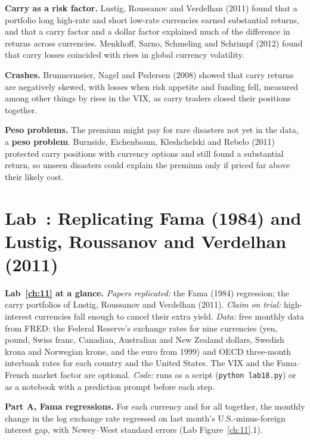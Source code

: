 \textbf{Carry as a risk factor.} Lustig, Roussanov and Verdelhan (2011) found that a portfolio long high-rate and short low-rate currencies earned substantial returns, and that a carry factor and a dollar factor explained much of the difference in returns across currencies. Menkhoff, Sarno, Schmeling and Schrimpf (2012) found that carry losses coincided with rises in global currency volatility.

\textbf{Crashes.} Brunnermeier, Nagel and Pedersen (2008) showed that carry returns are negatively skewed, with losses when risk appetite and funding fell, measured among other things by rises in the VIX, as carry traders closed their positions together.

\textbf{Peso problems.} The premium might pay for rare disasters not yet in the data, a \textbf{peso problem}. Burnside, Eichenbaum, Kleshchelski and Rebelo (2011) protected carry positions with currency options and still found a substantial return, so unseen disasters could explain the premium only if priced far above their likely cost.

\section{Lab~\thechapter: Replicating Fama (1984) and Lustig, Roussanov and Verdelhan (2011)}
\label{sec:06-lab}

\begin{callout}
\textbf{Lab~\ref{ch:11} at a glance.} \emph{Papers replicated:} the Fama (1984) regression; the carry portfolios of Lustig, Roussanov and Verdelhan (2011). \emph{Claim on trial:} high-interest currencies fall enough to cancel their extra yield. \emph{Data:} free monthly data from FRED: the Federal Reserve's exchange rates for nine currencies (yen, pound, Swiss franc, Canadian, Australian and New Zealand dollars, Swedish krona and Norwegian krone, and the euro from 1999) and OECD three-month interbank rates for each country and the United States. The VIX and the Fama--French market factor are optional. \emph{Code:} runs as a script (\texttt{python lab18.py}) or as a notebook with a prediction prompt before each step.
\end{callout}

\textbf{Part A, Fama regressions.} For each currency and for all together, the monthly change in the log exchange rate regressed on last month's U.S.-minus-foreign interest gap, with Newey--West standard errors (Lab Figure~\ref{ch:11}.1).

